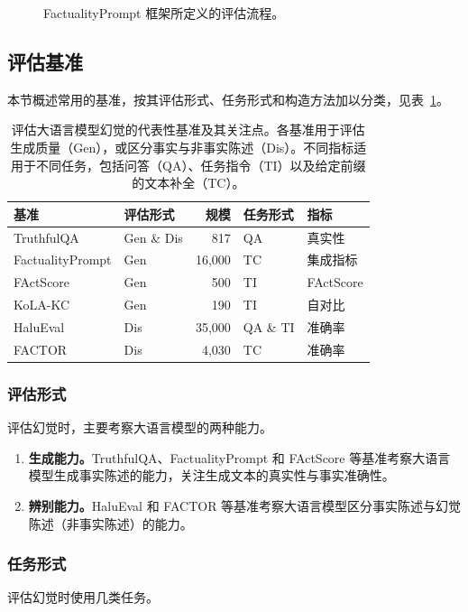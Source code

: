 \begin{figure}[!htbp]
\centering

\caption{FactualityPrompt 框架所定义的评估流程。}
\label{fig:ch06-factuality}
\end{figure}

\subsection{评估基准}
本节概述常用的基准，按其评估形式、任务形式和构造方法加以分类，见表~\ref{tab:ch06-hallucination-benchmarks}。

\begin{table}[!htbp]
\centering
\caption{评估大语言模型幻觉的代表性基准及其关注点。各基准用于评估生成质量（Gen），或区分事实与非事实陈述（Dis）。不同指标适用于不同任务，包括问答（QA）、任务指令（TI）以及给定前缀的文本补全（TC）。}
\label{tab:ch06-hallucination-benchmarks}
\small
\setlength{\tabcolsep}{3.5pt}
\begin{tabular}{@{}llrll@{}}
\toprule
基准 & 评估形式 & 规模 & 任务形式 & 指标\\
\midrule
TruthfulQA & Gen \& Dis & 817 & QA & 真实性\\
FactualityPrompt & Gen & 16,000 & TC & 集成指标\\
FActScore & Gen & 500 & TI & FActScore\\
KoLA-KC & Gen & 190 & TI & 自对比\\
HaluEval & Dis & 35,000 & QA \& TI & 准确率\\
FACTOR & Dis & 4,030 & TC & 准确率\\
\bottomrule
\end{tabular}
\end{table}

\subsubsection{评估形式}
评估幻觉时，主要考察大语言模型的两种能力。

\begin{enumerate}
\item \textbf{生成能力。}TruthfulQA、FactualityPrompt 和 FActScore 等基准考察大语言模型生成事实陈述的能力，关注生成文本的真实性与事实准确性。
\item \textbf{辨别能力。}HaluEval 和 FACTOR 等基准考察大语言模型区分事实陈述与幻觉陈述（非事实陈述）的能力。
\end{enumerate}

\subsubsection{任务形式}
评估幻觉时使用几类任务。

